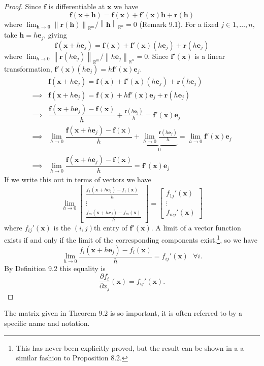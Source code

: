\documentclass{article}
\newcommand{\R}{\mathbb{R}}
\newcommand{\x}{\mathbf{x}}
\newcommand{\f}{\mathbf{f}}
\newcommand{\h}{\mathbf{h}}
\newcommand{\ze}{\mathbf{0}}
\newcommand{\norm}[1]{\left\lVert#1\right\rVert}
\theoremstyle{definition}
\begin{document}
\begin{proof}
Since $\f  $ is differentiable at $ \x $ we have $$ \f(\x+\h) = \f(\x) + \f'(\x)\h + \mathbf r(\h) $$  where $ \lim_{\h\to\ze} \norm{\mathbf r(\h)}_{\R^m}/\norm{\h}_{\R^n}=0 $ (Remark 9.1). For a fixed $ j \in {1,\ldots, n} $, take $ \h = h\mathbf e_j $, giving $$ \f(\x+h\mathbf e_j) = \f(\x) + \f'(\x)(h\mathbf e_j) + \mathbf r(h\mathbf e_j) $$  where $ \lim_{h\to0} \norm{\mathbf r(h\mathbf e_j)}_{\R^m}/\norm{h\mathbf e_j}_{\R^n}=0 $. Since $ \f'(\x) $ is a linear transformation, $ \f'(\x)(h\mathbf e_j) = h \f'(\x)\mathbf e_j $.
\begin{align*}
&\f(\x+h\mathbf e_j) = \f(\x) + \f'(\x)(h\mathbf e_j) + \mathbf r(h\mathbf e_j)\\
\implies  & \f(\x+h\mathbf e_j) = \f(\x) + h\f'(\x)\mathbf e_j+ \mathbf r(h\mathbf e_j)\\
\implies &\dfrac{ \f(\x+h\mathbf e_j) - \f(\x)}{h} +  \frac{\mathbf r(h\mathbf e_j)}{h}= \f'(\x)\mathbf e_j\\
\implies & \lim_{h\to0}\dfrac{ \f(\x+h\mathbf e_j) - \f(\x)}{h} +  \underbrace{ \lim_{h\to0}\frac{\mathbf r(h\mathbf e_j)}{h}}_0=  \lim_{h\to0}\f'(\x)\mathbf e_j\\\implies & \lim_{h\to0}\dfrac{ \f(\x+h\mathbf e_j) - \f(\x)}{h} =  \f'(\x)\mathbf e_j
\end{align*}
If we write this out in terms of vectors we have 
$$ \lim_{h\to0}\begin{bmatrix}
	\frac{f_1(\x+h\mathbf e_j) - f_1(\x)}{h}\\ \vdots \\ 
	\frac{f_m(\x+h\mathbf e_j) - f_m(\x)}{h}
\end{bmatrix} =  \begin{bmatrix}
f_{1j}'(\x)\\ \vdots \\ f_{mj}'(\x)
\end{bmatrix}$$ where $ f_{ij}'(\x) $ is the $ (i,j) $th entry of $ \f'(\x) $. A limit of a vector function exists if and only if the limit of the corresponding components exist,\footnote{This has never been explicitly proved, but the result can be shown in a a similar fashion to Proposition 8.2.}, so we have 
$$ 	 \lim_{h\to0}\frac{f_i(\x+h\mathbf e_j) - f_i(\x)}{h} = f_{ij}'(\x) \ \ \ \forall i.$$  By Definition 9.2 this equality is 
$$\frac{\partial f_i}{\partial x_j}(\x) = f_{ij}'(\x).$$ 
\end{proof}
The matrix given in Theorem 9.2 is so important, it is often referred to by a specific name and notation.
\end{document}
